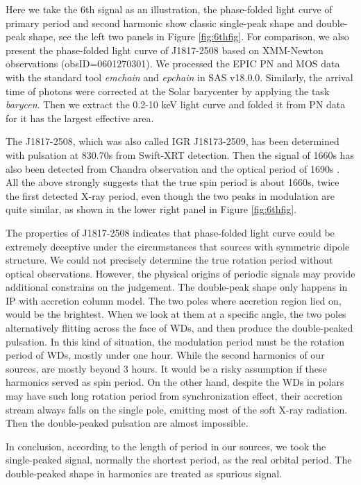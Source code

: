 \documentclass[fleqn,usenatbib]{mnras}
\begin{document}
Here we take the 6th signal as an illustration, the phase-folded light curve of primary period and second harmonic show classic  single-peak shape and double-peak shape, see the left two panels in Figure \ref{fig:6thfig}. For comparison, we also present the phase-folded light curve of J1817-2508 based on XMM-Newton observations (obsID=0601270301).
We processed the EPIC PN and MOS data with the standard tool \emph{emchain} and \emph{epchain} in SAS v18.0.0. Similarly, the arrival time of photons were corrected at the Solar barycenter  by applying the task \emph{barycen}.
Then we extract the 0.2-10 keV light curve and folded it from PN data for it has the largest effective area.

 The J1817-2508, which was also called IGR J18173-2509, has been determined with pulsation at 830.70s from Swift-XRT detection. Then the signal of 1660s has also been detected from Chandra observation \citep{2009ATel.2354....1N} and the optical period of 1690s \citep{2012A&A...542A..22B}. All the above strongly suggests that the true spin period is about 1660s, twice the first detected X-ray period, even though the two peaks in modulation are quite similar, as shown in the lower right panel in Figure \ref{fig:6thfig}.
 
 The properties of J1817-2508 indicates that phase-folded light curve could be extremely deceptive under the circumstances that sources with symmetric dipole structure. We could not precisely determine the true rotation period without optical observations. However, the physical origins of periodic signals may provide additional constrains on the judgement. The double-peak shape only happens in IP with accretion column model. The two poles where accretion region lied on, would be the brightest. When we look at them at a specific angle, the two poles alternatively flitting across the face of WDs, and then produce the double-peaked pulsation. In this kind of situation, the modulation period must be the rotation period of WDs, mostly under one hour. While the second harmonics of our sources, are mostly beyond 3 hours. It would be a risky assumption if these harmonics served as spin period. On the other hand, despite the WDs in polars may have such long rotation period from synchronization effect, their accretion stream always falls on the single pole, emitting most of the soft X-ray radiation. Then the double-peaked pulsation are almost impossible. 
 
 In conclusion, according to the length of period in our sources, we took the single-peaked signal, normally the shortest period, as the real orbital period. The double-peaked shape in harmonics are treated as spurious signal. 
\end{document}
